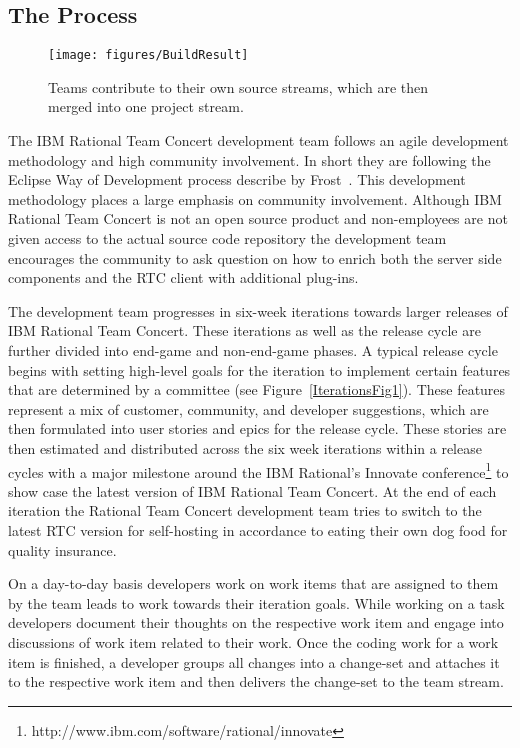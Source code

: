 \subsection{The Process}
\begin{figure}[t]
\begin{center}
\texttt{[image: figures/BuildResult]}
\caption{Teams contribute to their own source streams, which are then merged into one project stream.}
\label{fig:buildresult1}
\end{center}
\end{figure}



The IBM Rational Team Concert development team follows an agile development methodology and high community involvement.
In short they are following the Eclipse Way of Development process describe by Frost~\cite{frost:ieeesoftware:2007}.
This development methodology places a large emphasis on community involvement.
Although IBM Rational Team Concert is not an open source product and non-employees are not given access to the actual source code repository the development team encourages the community to ask question on how to enrich both the server side components and the RTC client with additional plug-ins.

The development team progresses in six-week iterations towards larger releases of IBM Rational Team Concert.
These iterations as well as the release cycle are further divided into end-game and non-end-game phases.
A typical release cycle begins with setting high-level goals for the iteration to implement certain features that are determined by a committee (see Figure~\ref{IterationsFig1}).
These features represent a mix of customer, community, and developer suggestions, which are then formulated into user stories and epics for the release cycle.
These stories are then estimated and distributed across the six week iterations within a release cycles with a major milestone around the IBM Rational's Innovate conference\footnote{http://www.ibm.com/software/rational/innovate} to show case the latest version of IBM Rational Team Concert. 
At the end of each iteration the Rational Team Concert development team tries to switch to the latest RTC version for self-hosting in accordance to eating their own dog food for quality insurance.

On a day-to-day basis developers work on work items that are assigned to them by the team leads to work towards their iteration goals.
While working on a task developers document their thoughts on the respective work item and engage into discussions of work item related to their work.
Once the coding work for a work item is finished, a developer groups all changes into a change-set and attaches it to the respective work item and then delivers the change-set to the team stream.

